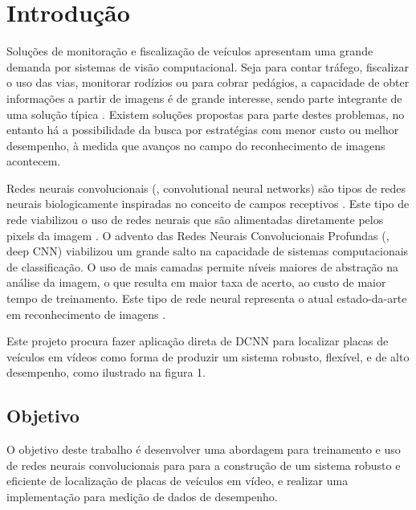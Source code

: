 
\chapter{Introdução}

Soluções de monitoração e fiscalização de veículos apresentam
uma grande demanda por sistemas de visão computacional. Seja
para contar tráfego, fiscalizar o uso das vias, monitorar
rodízios ou para cobrar pedágios, a capacidade de obter
informações a partir de imagens é de grande interesse, sendo parte integrante
de uma solução típica \cite{anagnostopoulos2008license}.  Existem
soluções propostas para parte destes problemas, no entanto há a
possibilidade da busca por estratégias com menor custo ou melhor
desempenho, à medida que avanços no campo do reconhecimento de
imagens acontecem.

Redes neurais convolucionais (, convolutional neural networks)
são tipos de redes neurais biologicamente inspiradas no conceito
de campos receptivos \cite{hubel1968receptive}. Este tipo de
rede viabilizou o uso de redes neurais que são alimentadas
diretamente pelos pixels da imagem \cite{lecun1998gradient}. O
advento das Redes Neurais Convolucionais Profundas (, deep CNN)
viabilizou um grande salto na capacidade de sistemas computacionais
de classificação. O uso de mais camadas permite níveis maiores de
abstração na análise da imagem, o que resulta em maior taxa de
acerto, ao custo de maior tempo de treinamento. Este tipo de rede
neural representa o atual estado-da-arte em reconhecimento de
imagens \cite{szegedy2015going}.

Este projeto procura fazer aplicação direta de DCNN para localizar
placas de veículos em vídeos como forma de produzir um sistema
robusto, flexível, e de alto desempenho, como ilustrado na figura 1.

\section{Objetivo}
O objetivo deste trabalho é desenvolver uma abordagem para
treinamento e uso de redes neurais convolucionais para para a
construção de um sistema robusto e eficiente de localização de
placas de veículos em vídeo, e realizar uma implementação para
medição de dados de desempenho.

